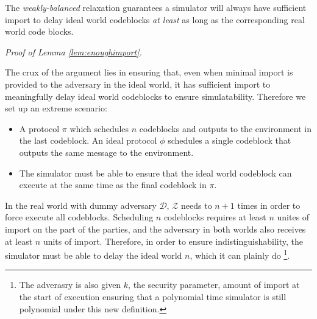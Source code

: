 \begin{lemma}\label{lem:enoughimport}

The \textit{weakly-balanced} relaxation guarantees a simulator  will always have sufficient import to delay ideal world codeblocks \textit{at least} as long as the corresponding real world code blocks.

\end{lemma}

\textit{Proof of Lemma \ref{lem:enoughimport}.}

The crux of the argument lies in ensuring that, even when minimal import is provided to the adversary in the ideal world, it has sufficient import to meaningfully delay ideal world codeblocks to ensure simulatability. 
Therefore we set up an extreme scenario:
\begin{itemize}
\item A protocol $\pi$ which schedules $n$ codeblocks and outputs to the environment in the last codeblock. An ideal protocol $\phi$ schedules a single codeblock that outputs the same message to the environment.
\item The simulator must be able to ensure that the ideal world codeblock can execute at the same time as the final codeblock in $\pi$.
\end{itemize}

In the real world with dummy adversary $\mathcal{D}$, $\mathcal{Z}$ needs to \Advance \Wasync $n+1$ times in order to force execute all codeblocks.
Scheduling $n$ codeblocks requires at least $n$ unites of import on the part of the parties, and the adversary in both worlds also receives at least $n$ units of import.
Therefore, in order to ensure indistinguishability, the simulator must be able to delay the ideal world \Wasync $n$, which it can plainly do \footnote{The adverasry is also given $k$, the security parameter, amount of import at the start of execution ensuring that a polynomial time simulator is still polynomial under this new definition.}.

